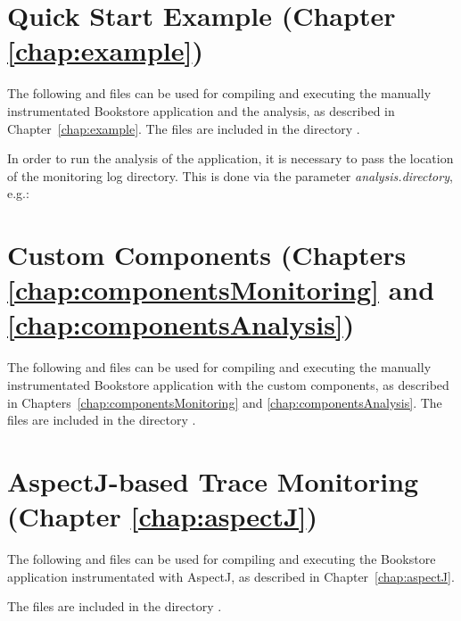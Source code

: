 \section{Quick Start Example (Chapter \ref{chap:example})}
The following  and  files can be %
used for compiling and executing the manually instrumentated Bookstore %
application and the analysis, as described in Chapter~\ref{chap:example}. %
The files are included in the directory \file{\manualInstrumentedBookstoreApplicationDirDistro{}/}.

      In order to run the analysis of the application, it is necessary to pass the location of the monitoring log directory. This is done via the parameter \textit{analysis.directory}, e.g.:
      \setBashListing
      

      \setPropertiesListing
      
      \setAntListing
      
\newpage
\section{Custom Components (Chapters \ref{chap:componentsMonitoring} and \ref{chap:componentsAnalysis})}
      The following  and  files can be used for compiling and executing the manually instrumentated Bookstore application with the custom components, as described in Chapters~\ref{chap:componentsMonitoring} and \ref{chap:componentsAnalysis}. %
The files are included in the directory \file{\customComponentsBookstoreApplicationDirDistro{}/}.
      \setPropertiesListing
      
      \setAntListing
      
\newpage
\section{AspectJ-based Trace Monitoring (Chapter \ref{chap:aspectJ})}
      The following  and  files can be used for compiling and executing the Bookstore application instrumentated with AspectJ, as described in Chapter~\ref{chap:aspectJ}. %

The files are included in the directory \file{\aspectJBookstoreApplicationDirDistro{}/}.
      \setPropertiesListing
           
\enlargethispage{1.1cm}
      \setAntListing
      